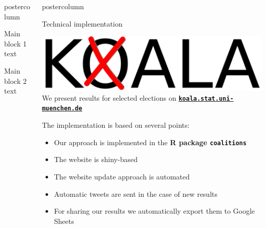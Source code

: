 \documentclass[final,hyperref={pdfpagelabels=false}]{beamer}
\newcommand{\bfBlue}[1]{\textcolor{koaladarkestblue}{\textbf{#1}}}
\newcommand*\circled[1]{\tikz[baseline=(char.base)]{
\node[shape=circle,draw,inner sep=2pt] (char) {#1};}}
\newlength{\columnheight}
\begin{document}
\begin{frame}
\begin{columns}
\begin{column}{1\textwidth}
\begin{columns}[T]
\begin{column}{.484\textwidth}
\begin{beamercolorbox}[center,wd=\textwidth]{postercolumn}
\begin{minipage}[T]{.95\textwidth}  %

\begin{block}{\footnotesize \circled{1} Main block 1}
text
\end{block}


\begin{block}{\footnotesize \circled{2} Main block 2}
text
\end{block}



\end{minipage}
\end{beamercolorbox}
\end{column}

\begin{column}{.484\textwidth}
\begin{beamercolorbox}[center,wd=\textwidth]{postercolumn}
\begin{minipage}[T]{.95\textwidth}  %


\begin{block}{\footnotesize \circled{3} Technical implementation}
\begin{center}
\includegraphics[height=5ex]{figures/Koala_Logo_ohneSchrift}
\\[2ex]
We present results for selected elections on
\bfBlue{\texttt{\href{test}{koala.stat.uni-muenchen.de}}}
\end{center}
\vspace{2ex}
The implementation is based on several points:
\begin{itemize}
  \item Our approach is implemented in the \bfBlue{R package \texttt{coalitions}} 
  \item The website is shiny-based
  \item The website update approach is automated
  \item Automatic tweets are sent in the case of new results
  \item For sharing our results we automatically export them to Google Sheets
\end{itemize}


\end{block}
\end{minipage}
\end{beamercolorbox}
\end{column}
\end{columns}
\end{column}
\end{columns}
\end{frame}
\end{document}
